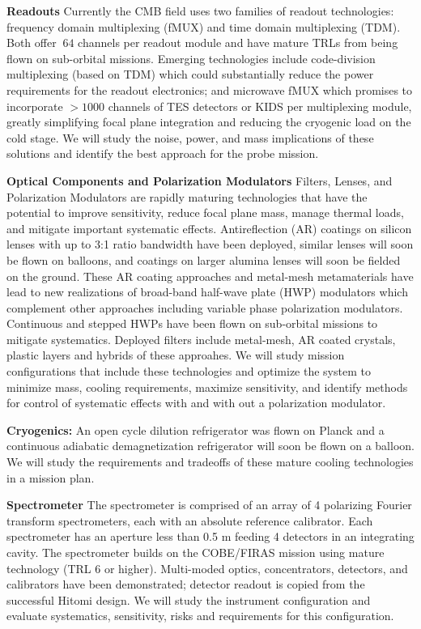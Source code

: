 {\bf Readouts}  Currently the CMB field uses two families of readout technologies: frequency domain multiplexing (fMUX) and time domain multiplexing (TDM).  Both offer $~64$ channels per readout module and have mature TRLs from being flown on sub-orbital missions.    Emerging technologies include code-division multiplexing (based on TDM) which could substantially reduce the power requirements for the readout electronics; and microwave fMUX which promises to incorporate $>1000$ channels of TES detectors or KIDS per multiplexing module, greatly simplifying focal plane integration and reducing the cryogenic load on the cold stage.   We will study the noise, power, and mass implications of these solutions and identify the best approach for the probe mission.

{\bf Optical Components and Polarization Modulators}  Filters, Lenses, and Polarization Modulators are rapidly maturing technologies that have the potential to improve sensitivity, reduce focal plane mass, manage thermal loads, and mitigate important systematic effects.  Antireflection (AR) coatings on silicon lenses with up to 3:1 ratio bandwidth have been deployed, similar lenses will soon be flown on balloons, and coatings on larger alumina lenses will soon be fielded on the ground.   These AR coating approaches and metal-mesh metamaterials have lead to new realizations of broad-band half-wave plate (HWP) modulators which complement other approaches including variable phase polarization modulators.  Continuous and stepped HWPs have been flown on sub-orbital missions to mitigate systematics.  Deployed filters include metal-mesh, AR coated crystals, plastic layers and hybrids of these approahes.    We will study mission configurations that include these technologies and optimize the system to minimize mass, cooling requirements, maximize sensitivity, and identify methods for control of systematic effects with and with out a polarization modulator.

{\bf Cryogenics:}  An open cycle dilution refrigerator was flown on Planck and a continuous adiabatic demagnetization refrigerator will soon be flown on a balloon.   We will study the requirements and tradeoffs of these mature cooling technologies in a mission plan.


{\bf Spectrometer}
The spectrometer is comprised of an array of 4 polarizing Fourier transform spectrometers, each with an absolute reference calibrator.
Each spectrometer has an aperture less than 0.5 m
feeding 4 detectors in an integrating cavity.  The spectrometer builds on the COBE/FIRAS mission
using mature technology (TRL 6 or higher).
Multi-moded optics, concentrators, detectors, and calibrators
have been demonstrated;
detector readout is copied from the successful Hitomi design.  We will study the instrument configuration and evaluate systematics, sensitivity, risks and requirements for this configuration.

